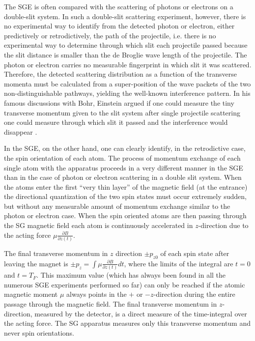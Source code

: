 \documentclass{article}
\begin{document}
The SGE is often compared with the scattering of photons or electrons on a double-slit system. In such a double-slit scattering experiment, however, there is no experimental way to identify from the detected photon or electron, either predictively or retrodictively, the path of the projectile, i.e. there is no experimental way to determine through which slit each projectile passed because the slit distance is smaller than the de Broglie wave length of the projectile. The photon or electron carries no measurable fingerprint in which slit it was scattered. Therefore, the detected scattering distribution as a function of the transverse momenta must be calculated from a super-position of the wave packets of the two non-distinguishable pathways, yielding the well-known interference pattern. In his famous discussions with Bohr, Einstein argued if one could measure the tiny transverse momentum given to the slit system after single projectile scattering one could measure through which slit it passed and the interference would disappear \citep{BohrN1949Discussion}.  

In the SGE, on the other hand, one can clearly identify, in the retrodictive case, the spin orientation of each atom. The process of momentum exchange of each single atom with the apparatus proceeds in a very different manner in the SGE  than in the case of photon or electron scattering in a double slit system. When the atoms enter the first ``very thin layer'' of the magnetic field (at the entrance) the directional quantization of the two spin states must occur extremely sudden, but without any measurable amount of momentum exchange similar to the photon or electron case. When the spin oriented atoms are then passing through the SG magnetic field each atom is continuously accelerated  in $z$-direction due to the acting force $\mu\frac{\partial B}{\partial z(t)}$. 

The final transverse momentum in $z$ direction $\pm p_{z0}$  of each spin state after leaving the magnet is $\pm p_z=\int \mu\frac{\partial B}{\partial z(t)} dt$, where the limits of the integral are $t = 0$  and $t = T_F$. This maximum value (which has always been found in all the numerous SGE experiments performed so far) can only be reached if the atomic magnetic moment $\mu$ always points in the $+$ or $-z$-direction during the entire passage through the magnetic field. The final transverse momentum in $z$-direction, measured by the detector,  is a direct measure of the time-integral over the acting force. The SG apparatus measures only this transverse momentum and never spin orientations. 
\end{document}
